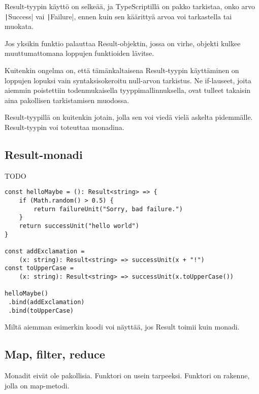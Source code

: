 Result-tyypin käyttö on selkeää, ja TypeScriptillä on pakko tarkistaa, onko arvo \texttt|Success| vai \texttt|Failure|, ennen kuin sen käärittyä arvoa voi tarkastella tai muokata.

Jos yksikin funktio palauttaa Result-objektin, jossa on virhe, objekti kulkee muuttumattomana loppujen funktioiden lävitse.

Kuitenkin ongelma on, että tämänkaltaisena Result-tyypin käyttäminen on loppujen lopuksi vain syntaksisokeroitu null-arvon tarkistus. Ne if-lauseet, joita aiemmin poistettiin todenmukaisella tyyppimallinnuksella, ovat tulleet takaisin aina pakollisen tarkistamisen muodossa.

Result-tyypillä on kuitenkin jotain, jolla sen voi viedä vielä askelta pidemmälle. Result-tyypin voi toteuttaa monadina.


\subsection{Result-monadi}

TODO

\begin{code}
    \begin{verbatim}
const helloMaybe = (): Result<string> => {
    if (Math.random() > 0.5) {
        return failureUnit("Sorry, bad failure.")
    }
    return successUnit("hello world")
}

const addExclamation = 
    (x: string): Result<string> => successUnit(x + "!")
const toUpperCase = 
    (x: string): Result<string> => successUnit(x.toUpperCase())

helloMaybe()
 .bind(addExclamation)
 .bind(toUpperCase)
\end{verbatim}
    \caption{Miltä aiemman esimerkin koodi voi näyttää, jos Result toimii kuin monadi.}
    \label{code:result_monad_example}
\end{code}

\subsection{Map, filter, reduce}

Monadit eivät ole pakollisia. Funktori on usein tarpeeksi. Funktori on rakenne, jolla on map-metodi.
